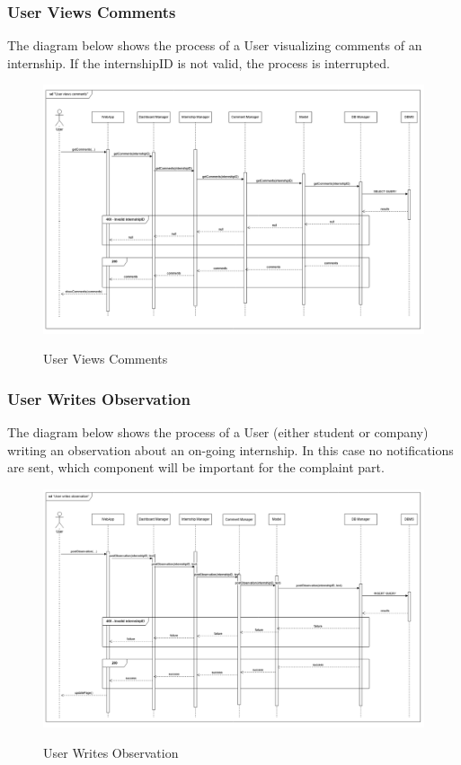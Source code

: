 \documentclass[a4paper,12pt]{article}
\begin{document}
\subsubsection*{User Views Comments}
The diagram below shows the process of a User visualizing comments of an internship. If the internshipID is not valid, the process is interrupted.
\begin{figure}[H]
\centering
\includegraphics[scale = 0.4]{DD_figures/RuntimeView/UserViewsCommentsRV.png}\\
\caption{User Views Comments}
\end{figure}

\newpage

\subsubsection*{User Writes Observation}
The diagram below shows the process of a User (either student or company) writing an observation about an on-going internship. In this case no notifications are sent, which component will be important for the complaint part.
\begin{figure}[H]
\centering
\includegraphics[scale = 0.4]{DD_figures/RuntimeView/UserWritesObservationRV.png}\\
\caption{User Writes Observation}
\end{figure}
\end{document}
